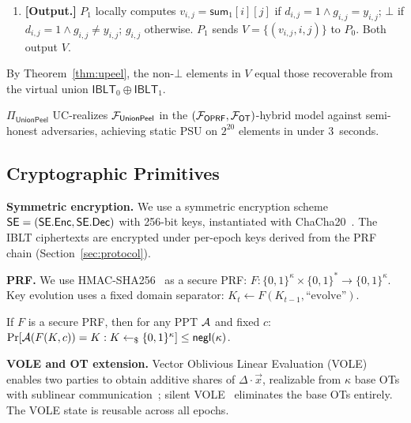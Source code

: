 \begin{center}
{\begin{minipage}{0.95\columnwidth}
\begin{enumerate}
\item \textbf{[Output.]}
$P_1$ locally computes
$v_{i,j} = \mathsf{sum}_1[i][j]$ if $d_{i,j}{=}1 \land g_{i,j}{=}y_{i,j}$;
$\bot$ if $d_{i,j}{=}1 \land g_{i,j}{\neq}y_{i,j}$; $g_{i,j}$ otherwise.
$P_1$ sends $V = \{(v_{i,j}, i, j)\}$ to $P_0$. Both output $V$.
\end{enumerate}
By Theorem~\ref{thm:upeel}, the non-$\bot$ elements in $V$ equal those
recoverable from the virtual union $\mathsf{IBLT}_0 \oplus \mathsf{IBLT}_1$.

\smallskip
\end{minipage}}
\label{fig:unionpeel}
\end{center}

\begin{theorem}\label{thm:unionpeel-sec}
$\Pi_{\mathsf{UnionPeel}}$ UC-realizes $\mathcal{F}_{\mathsf{UnionPeel}}$
in the $(\mathcal{F}_{\mathsf{OPRF}}, \mathcal{F}_{\mathsf{OT}})$-hybrid model against
semi-honest adversaries, achieving static PSU on $2^{20}$ elements in
under 3~seconds.
\end{theorem}


\subsection{Cryptographic Primitives}

\textbf{Symmetric encryption.} We use a symmetric encryption scheme
$\mathsf{SE} = (\mathsf{SE}.\mathsf{Enc}, \mathsf{SE}.\mathsf{Dec})$ with 256-bit keys, instantiated with
ChaCha20~\cite{Ber08}. The IBLT ciphertexts are encrypted under per-epoch
keys derived from the PRF chain (Section~\ref{sec:protocol}).

\textbf{PRF.} We use HMAC-SHA256~\cite{BCK96} as a secure PRF:
$F: \{0,1\}^\kappa \times \{0,1\}^* \to \{0,1\}^\kappa$. Key evolution uses a
fixed domain separator: $K_t \leftarrow F(K_{t-1}, \text{``evolve''})$.

\begin{lemma}\label{lem:prf-ow}
If $F$ is a secure PRF, then for any PPT $\mathcal{A}$ and fixed $c$:
$\Pr[\mathcal{A}(F(K, c)) = K : K \leftarrow_{\$} \{0,1\}^\kappa] \leq \mathsf{negl}(\kappa)$.
\end{lemma}

\textbf{VOLE and OT extension.} Vector Oblivious Linear Evaluation (VOLE)
enables two parties to obtain additive shares of $\Delta \cdot \vec{x}$,
realizable from $\kappa$ base OTs with sublinear communication~\cite{RS21,RR22};
silent VOLE~\cite{RRT23} eliminates the base OTs entirely. The VOLE state is
reusable across all epochs.

